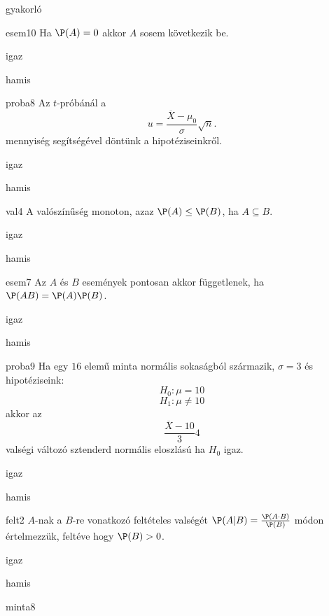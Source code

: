 \documentclass[12pt]{article}
\begin{document}
\begin{quiz}{gyakorló}

\begin{multi}[feedback={Például: legyen a kísérlet random húzás a $[0,1]$-ből és $A=\{\frac{1}{2}\}$}]{esem10}
Ha $\P(A)=0$ akkor $A$ sosem következik be.
\item igaz
\item* hamis
\end{multi}
\begin{multi}[feedback={A fenti formula a $u$-próba ún. próbastatisztikája.}]{proba8}
Az $t$-próbánál a 
$$
u=\frac{\overline{X}-\mu_0}{\sigma}\sqrt{n}.
$$
mennyiség segítségével döntünk a hipotéziseinkről.
\item igaz
\item* hamis
\end{multi}
\begin{multi}[feedback={$B=A\cup (B\setminus A)$+additívitás}]{val4}
A valószínűség monoton, azaz $\P(A)\le \P(B)$, ha $A\subseteq B$.
\item* igaz
\item hamis
\end{multi}
\begin{multi}[feedback={Definíció.}]{esem7}
Az $A$ és $B$ események pontosan akkor függetlenek, ha $\P(AB)=\P(A)\P(B)$.
\item* igaz
\item hamis
\end{multi}
\begin{multi}[feedback={Igen, éppen ez alapján tudunk dönteni. Ahhoz képest hogy sztenderd normális átlagos, tipikus értéket, vagy kiugró, extrém értéket látunk.}]{proba9}
Ha egy $16$ elemű minta normális sokaságból származik, $\sigma=3$ és hipotéziseink:
$$
H_0: \mu=10
$$
$$
H_1: \mu\neq 10
$$
akkor az 
$$
\frac{\overline{X}-10}{3}4
$$
valségi változó sztenderd normális eloszlású ha $H_0$ igaz.
\item* igaz
\item hamis
\end{multi}
\begin{multi}[feedback={Def.}]{felt2}
$A$-nak a $B$-re vonatkozó feltételes valségét $\P(A|B)=\frac{\P(A\cdot B)}{\P(B)}$ módon értelmezzük, feltéve hogy $\P(B)>0$.
\item* igaz
\item hamis
\end{multi}
\begin{multi}[feedback={Az $s^2$ torzítatlan becslése a sokasági (elméleti) szórásnégyzetnek}]{minta8}

\end{multi}
\end{quiz}
\end{document}

